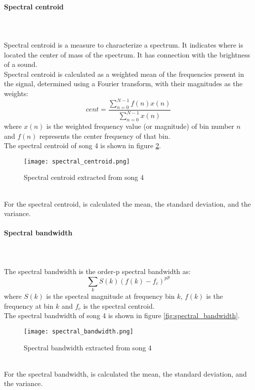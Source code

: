 \paragraph{Spectral centroid}
\mbox{} \\ \\
Spectral centroid is a measure to characterize a spectrum. It indicates where is located the center of mass of the spectrum. It has connection with the brightness of a sound.
\\
Spectral centroid is calculated as a weighted mean of the frequencies present in the signal, determined using a Fourier transform, with their magnitudes as the weights:
\begin{equation}
	cent=\dfrac{\sum_{n=0}^{N-1}{f(n)x(n)}}{\sum_{n=0}^{N-1}{x(n)}}
\end{equation}
where $x(n)$ is the weighted frequency value (or magnitude) of bin number $n$ and $f(n)$ represents the center frequency of that bin.
\\
The spectral centroid of song 4 is shown in figure \ref{fig:spectral_centroid}.
\begin{figure}[h]
    \centering
    \texttt{[image: spectral\_centroid.png]} 
	\caption{Spectral centroid extracted from song 4}
    \label{fig:spectral_centroid}
\end{figure}
\\
For the spectral centroid, is calculated the mean, the standard deviation, and the variance.

\paragraph{Spectral bandwidth}
\mbox{} \\ \\
The spectral bandwidth is the order-p spectral bandwidth as:
\begin{equation}
	{\sum_{k}{S(k){(f(k)-f_c)}^p}}^p
\end{equation}
where $S(k)$ is the spectral magnitude at frequency bin $k$, $f(k)$ is the frequency at bin $k$ and $f_c$ is the spectral centroid.
\\
The spectral bandwidth of song 4 is shown in figure \ref{fig:spectral_bandwidth}.
\begin{figure}[h]
    \centering
    \texttt{[image: spectral\_bandwidth.png]} 
	\caption{Spectral bandwidth extracted from song 4}
    \label{fig:spectral_centroid}
\end{figure}
\\
For the spectral bandwidth, is calculated the mean, the standard deviation, and the variance.


